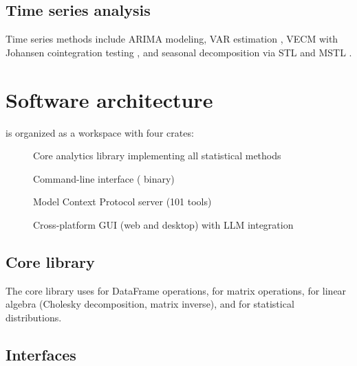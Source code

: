 \documentclass[article]{jss}
\begin{document}
\subsection{Time series analysis} \label{sec:timeseries}

Time series methods include ARIMA modeling, VAR estimation \citep{Sims:1980},
VECM with Johansen cointegration testing \citep{Johansen:1991}, and seasonal
decomposition via STL \citep{Cleveland+Cleveland+McRae+Terpenning:1990} and
MSTL \citep{Hyndman+Khandakar:2008}.



\section{Software architecture} \label{sec:architecture}


 is organized as a  workspace with four crates:

\begin{description}
  \item[] Core analytics library implementing all statistical methods
  \item[] Command-line interface ( binary)
  \item[] Model Context Protocol server (101 tools)
  \item[] Cross-platform GUI (web and desktop) with LLM integration
\end{description}

\subsection{Core library}

The core library uses  \citep{polars} for DataFrame operations,
 \citep{ndarray} for matrix operations,  \citep{faer}
for linear algebra (Cholesky decomposition, matrix inverse), and 
\citep{statrs} for statistical distributions.

\subsection{Interfaces}
\end{document}
